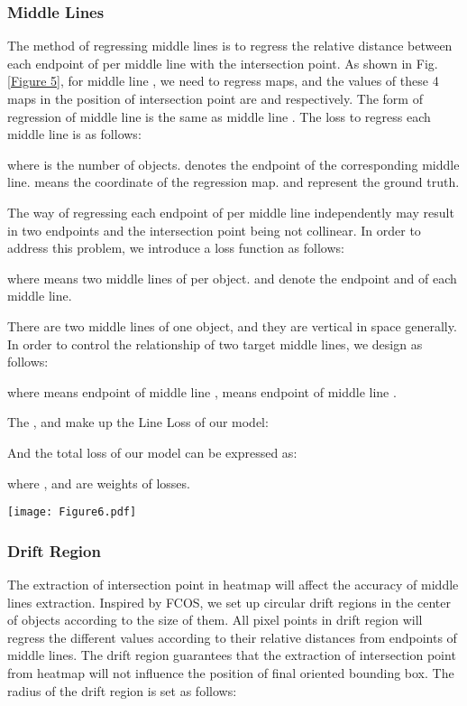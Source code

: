\documentclass[runningheads]{llncs}
\begin{document}
\subsubsection{Middle Lines} \label{section:3.3.2}

The method of regressing middle lines is to regress the relative distance between each endpoint of per middle line with the intersection point. As shown in Fig. \ref{Figure 5}, for middle line , we need to regress  maps, and the values of these 4 maps in the position of intersection point are  and  respectively. The form of regression of middle line  is the same as middle line . The loss to regress each middle line is as follows:


where  is the number of objects.  denotes the endpoint of the corresponding middle line.  means the coordinate of the regression map.  and  represent the ground truth. 

The way of regressing each endpoint of per middle line independently may result in two endpoints and the intersection point being not collinear. In order to address this problem, we introduce a loss function as follows:


where  means two middle lines of per object.  and  denote the endpoint  and  of each middle line.


There are two middle lines of one object, and they are vertical in space generally. In order to control the relationship of two target middle lines, we design  as follows:


where  means endpoint  of middle line ,  means endpoint  of middle line .

The ,  and  make up the Line Loss of our model:


And the total loss of our model can be expressed as:

where  ,  and  are weights of losses.

\begin{figure*}[!t]
	\centering
	\texttt{[image: Figure6.pdf]}
\caption{Illustration of drift region. Per pixel in drift region will regress the relative distances from 4 endpoints of corresponding two middle lines.} 
	\label{Figure 5}
\end{figure*}

\subsubsection{Drift Region}

The extraction of intersection point in heatmap will affect the accuracy of middle lines extraction. Inspired by FCOS\cite{tian2019fcos}, we set up circular drift regions in the center of objects according to the size of them. All pixel points in drift region will regress the different values according to their relative distances from endpoints of middle lines. The drift region guarantees that the extraction of intersection point from heatmap will not influence the position of final oriented bounding box. The radius of the drift region is set as follows:
\end{document}
